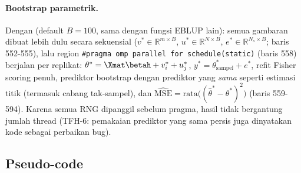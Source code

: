 \paragraph{Bootstrap parametrik.} Dengan  (default
$B=100$, sama dengan fungsi EBLUP lain): semua gambaran dibuat lebih dulu secara sekuensial
($v^\ast\in\mathbb R^{m\times B}$, $u^\ast\in\mathbb R^{N\times B}$,
$e^\ast\in\mathbb R^{N_s\times B}$; baris 552-555), lalu region
\texttt{\#pragma omp parallel for schedule(static)} (baris 558) berjalan per
replikat: $\theta^\ast=\Xmat\betah+v^\ast_i+u^\ast_j$,
$y^\ast=\theta^\ast_{\text{sampel}}+e^\ast$, refit Fisher scoring penuh,
prediktor bootstrap dengan prediktor yang \emph{sama} seperti estimasi titik
(termasuk cabang tak-sampel), dan $\widehat{\mathrm{MSE}}=\mathrm{rata}
\bigl((\hat\theta^\ast-\theta^\ast)^2\bigr)$ (baris 559-594). Karena semua
RNG dipanggil sebelum pragma, hasil tidak bergantung jumlah thread
(TFH-6: pemakaian prediktor yang sama persis juga dinyatakan kode sebagai
perbaikan bug).

\subsection{Pseudo-code}\label{sec:twofold-algo}

